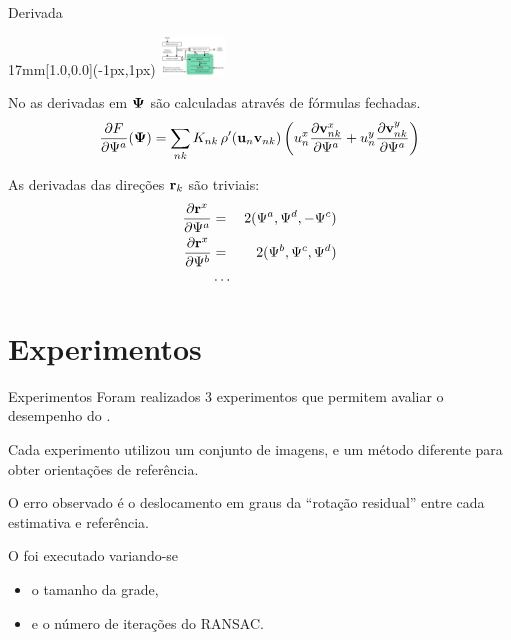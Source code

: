 \begin{frame}{Derivada}
  \begin{textblock*}{17mm}[1.0,0.0](\paperwidth-1px,1px)
    \includegraphics[width=17mm]{blocos_s4.png}
  \end{textblock*}
  No \corisco as derivadas em ${\boldsymbol{\Psi}}$ são calculadas através de fórmulas fechadas.
  \[
  \frac{\partial F}{\partial{\Psi^a}}({\boldsymbol{\Psi}}) = \sum_{nk}K_{nk}\,\rho^\prime({\mathbf{u}}_n{\mathbf{v}}_{nk})
  \left(u_n^x\frac{\partial{\mathbf{v}}_{nk}^x}{\partial{\Psi^a}} + u_n^y\frac{\partial{\mathbf{v}}_{nk}^y}{\partial{\Psi^a}}\right)
  \]

  As derivadas das direções ${\mathbf{r}}_k$ são triviais:
    \begin{eqnarray*}
      \frac{\partial {\mathbf{r}}^x}{\partial {\Psi^a}} &=& 2( {\Psi^a}, {\Psi^d},-{\Psi^c})\\
      \frac{\partial {\mathbf{r}}^x}{\partial {\Psi^b}} &=& 2( {\Psi^b}, {\Psi^c}, {\Psi^d})\\
      &\cdots&
    \end{eqnarray*}
  
\end{frame}

















\section[5--Experimentos]{Experimentos}

\begin{frame}{Experimentos}
  Foram realizados 3 experimentos que permitem avaliar o desempenho do
  \corisco.

  Cada experimento utilizou um conjunto de imagens, e um método diferente para
  obter orientações de referência.

  O erro observado é o deslocamento em graus da ``rotação residual'' entre
  cada estimativa e referência.

  O \corisco foi executado variando-se\\
  \begin{itemize}
  \item o tamanho da grade,
  \item e o número de iterações do RANSAC.
  \end{itemize}
\end{frame}

